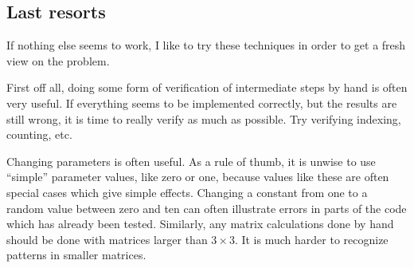 % 
% 

\subsection{Last resorts}

If nothing else seems to work, I like to try these techniques in order to get a fresh view on the problem.

First off all, doing some form of verification of intermediate steps by hand is often very useful. If everything seems to be implemented correctly, but the results are still wrong, it is time to really verify as much as possible. Try verifying indexing, counting, etc.

Changing parameters is often useful. As a rule of thumb, it is unwise to use ``simple'' parameter values, like zero or one, because values like these are often special cases which give simple effects. 
Changing a constant from one to a random value between zero and ten can often illustrate errors in parts of the code which has already been tested. 
Similarly, any matrix calculations done by hand should be done with matrices larger than $3\times 3$. 
It is much harder to recognize patterns in smaller matrices.


